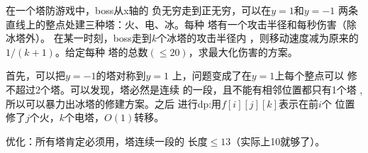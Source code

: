 \begin{prob}
	在一个塔防游戏中，boss从x轴的
	负无穷走到正无穷，可以在$y=1$和$y=-1$
	两条直线上的整点处建三种塔：火、电、冰。每种
	塔有一个攻击半径和每秒伤害（除冰塔外）。
	在某一时刻，boss走到$k$个冰塔的攻击半径内
	，则移动速度减为原来的$1/(k+1)$。给定每种
	塔的总数$(\le 20)$，求最大化伤害的方案。
\end{prob}

\begin{sol}
	首先，可以把$y=-1$的塔对称到$y=1$
	上，问题变成了在$y=1$上每个整点可以
	修不超过2个塔。可以发现，塔必然是连续
	的一段，且不能有相邻位置都只有1个塔
	,所以可以暴力出冰塔的修建方案。之后
	进行dp:用$f[i][j][k]$表示在前$i$个
	位置修了$j$个火，$k$个电塔，$O(1)$转移。
	\par 优化：所有塔肯定必须用，塔连续一段的
	长度$\le 13$（实际上10就够了）。
\end{sol}

